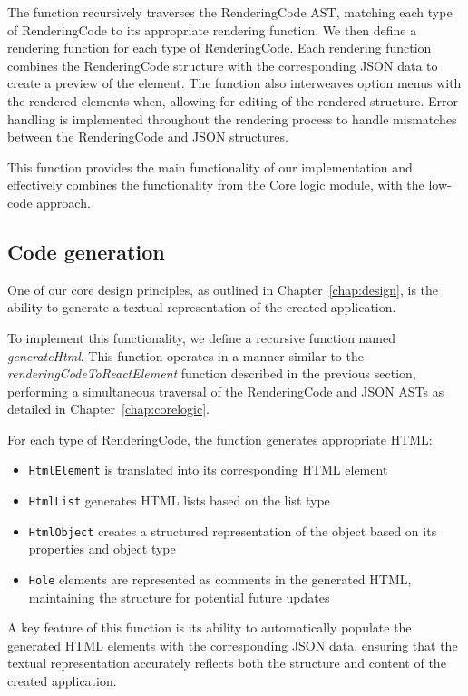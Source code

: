 The function recursively traverses the RenderingCode AST, matching each type of RenderingCode to its appropriate rendering function.
We then define a rendering function for each type of RenderingCode.
Each rendering function combines the RenderingCode structure with the corresponding JSON data to create a preview of the element.
The function also interweaves option menus with the rendered elements when, allowing for editing of the rendered structure.
Error handling is implemented throughout the rendering process to handle mismatches between the RenderingCode and JSON structures.

This function provides the main functionality of our implementation and effectively combines the functionality from the Core logic module,
with the low-code approach.

\subsection{Code generation}

One of our core design principles, as outlined in Chapter~\ref{chap:design},
is the ability to generate a textual representation of the created application.

To implement this functionality, we define a recursive function named \emph{generateHtml}.
This function operates in a manner similar to the \emph{renderingCodeToReactElement} function described in the previous section,
performing a simultaneous traversal of the RenderingCode and JSON ASTs as detailed in Chapter~\ref{chap:corelogic}.

For each type of RenderingCode, the function generates appropriate HTML:
\begin{itemize}
	\item \texttt{HtmlElement} is translated into its corresponding HTML element
	\item \texttt{HtmlList} generates HTML lists based on the list type
	\item \texttt{HtmlObject} creates a structured representation of the object based on its properties and object type
	\item \texttt{Hole} elements are represented as comments in the generated HTML, maintaining the structure for potential future updates
\end{itemize}

A key feature of this function is its ability to automatically populate the generated HTML elements with the corresponding JSON data,
ensuring that the textual representation accurately reflects both the structure and content of the created application.

